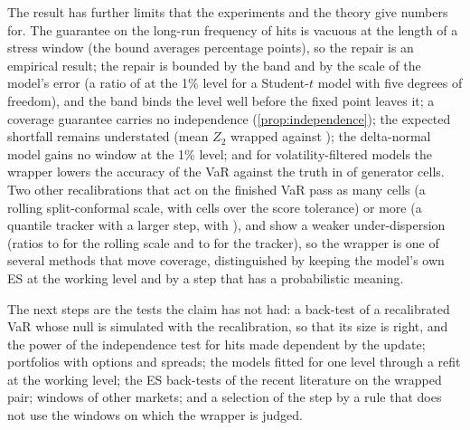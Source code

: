The result has further limits that the experiments and the theory give numbers for. The guarantee on the long-run frequency of hits is vacuous at the length of a stress window (the bound averages \thAMeanSimple{} percentage points), so the repair is an empirical result; the repair is bounded by the band and by the scale of the model's error (a ratio of \thCCmaxOne{} at the 1\% level for a Student-$t$ model with five degrees of freedom), and the band binds the level well before the fixed point leaves it; a coverage guarantee carries no independence (\cref{prop:independence}); the expected shortfall remains understated (mean $Z_2$ \tenMeanZtwoAci{} wrapped against \tenMeanZtwoUnw{}); the delta-normal model gains no window at the 1\% level; and for volatility-filtered models the wrapper lowers the accuracy of the VaR against the truth in \genErrWorseCells{} of \genErrWorseDen{} generator cells. Two other recalibrations that act on the finished VaR pass as many cells (a rolling split-conformal scale, with \cmpRollTenFzOver{} cells over the score tolerance) or more (a quantile tracker with a larger step, with \cmpTrkLargeTenFzOver{}), and show a weaker under-dispersion (ratios \dispRatioRollMin{} to \dispRatioRollMax{} for the rolling scale and \dispRatioTrkMin{} to \dispRatioTrkMax{} for the tracker), so the wrapper is one of several methods that move coverage, distinguished by keeping the model's own ES at the working level and by a step that has a probabilistic meaning.

The next steps are the tests the claim has not had: a back-test of a recalibrated VaR whose null is simulated with the recalibration, so that its size is right, and the power of the independence test for hits made dependent by the update; portfolios with options and spreads; the models fitted for one level through a refit at the working level; the ES back-tests of the recent literature on the wrapped pair; windows of other markets; and a selection of the step by a rule that does not use the windows on which the wrapper is judged.
